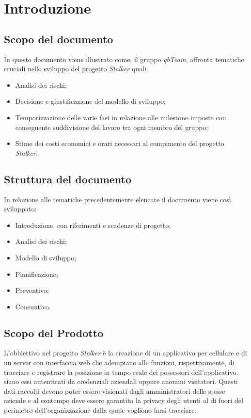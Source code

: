 \section{Introduzione}
\subsection{Scopo del documento}
In questo documento viene illustrato come, il gruppo \textit{qbTeam}, affronta tematiche cruciali nello sviluppo del progetto \textit{Stalker} quali:
\begin{itemize}
    \item Analisi dei rischi;
    \item Decisione e giustificazione del modello di sviluppo;
    \item Temporizzazione delle varie fasi in relazione alle milestone imposte con conseguente suddivisione del lavoro tra ogni membro del gruppo;
    \item Stime dei costi economici e orari necessari al compimento del progetto \textit{Stalker}.
\end{itemize}

\subsection{Struttura del documento}
In relazione alle tematiche precedentemente elencate il documento viene così sviluppato:
\begin{itemize}
    \item Introduzione, con riferimenti e scadenze di progetto;
    \item Analisi dei rischi;
    \item Modello di sviluppo;
    \item Pianificazione;
    \item Preventivo;
    \item Consuntivo.
\end{itemize}

\subsection{Scopo del Prodotto}
L'obbiettivo nel progetto \textit{Stalker} è la creazione di un applicativo per cellulare e di un server con interfaccia web che adempiano alle funzioni, rispettivamente, di 
tracciare e registrare la posizione in tempo reale dei possessori dell'applicativo, siano essi autenticati da credenziali aziendali oppure anonimi visitatori.
Questi dati raccolti devono poter essere visionati dagli amministratori delle stesse aziende e al contempo deve essere garantita la privacy degli utenti al di fuori del perimetro dell'organizzazione dalla quale vogliono farsi tracciare.

